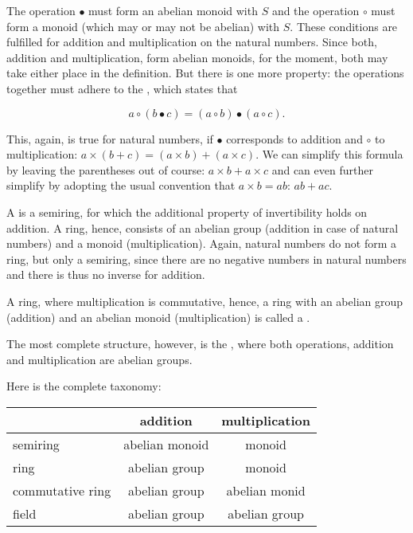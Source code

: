 \documentclass{scrreprt}
\begin{document}
The operation $\bullet$ must form an abelian monoid with $S$ and
the operation $\circ$ must form a monoid 
(which may or may not be abelian) with $S$.
These conditions are fulfilled for addition and multiplication
on the natural numbers. 
Since both, addition and multiplication, form
abelian monoids, for the moment, both may take
either place in the definition.
But there is one more property: 
the operations together must adhere to
the , which states that

\begin{equation}
a \circ (b \bullet c) = (a \circ b) \bullet (a \circ c).
\end{equation}

This, again, is true for natural numbers, 
if $\bullet$ corresponds to addition 
and $\circ$ to multiplication:
$a \times (b + c) = (a \times b) + (a \times c)$.
We can simplify this formula by leaving the parentheses out of course:
$a \times b + a \times c$ and can even further simplify by adopting
the usual convention that $a \times b = ab$: $ab + ac$.

A  is a semiring,
for which the additional property
of invertibility holds on addition.
A ring, hence, consists of an abelian group
(addition in case of natural numbers)
and a monoid (multiplication).
Again, natural numbers do not form a ring,
but only a semiring, since there are no negative numbers
in natural numbers and there is thus no inverse 
for addition.

A ring, where multiplication is commutative,
hence, a ring with an abelian group (addition)
and an abelian monoid (multiplication) is called
a .

The most complete structure, however, is the ,
where both operations, addition and multiplication
are abelian groups.

Here is the complete taxonomy: 

\begin{center}
\begin{tabular}{| l || c | c |}\hline
                    & addition & multiplication \\\hline\hline
  semiring          & abelian monoid & monoid \\\hline
  ring              & abelian group  & monoid \\\hline
  commutative ring  & abelian group & abelian monid \\\hline
  field             & abelian group & abelian group \\\hline
\end{tabular}
\end{center}
\end{document}

